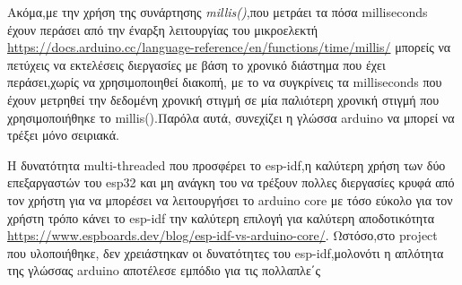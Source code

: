 Ακόμα,με την χρήση της συνάρτησης \textit{millis()},που μετράει τα πόσα milliseconds έχουν περάσει από την έναρξη λειτουργίας του μικροελεκτή \url{https://docs.arduino.cc/language-reference/en/functions/time/millis/} μπορείς να πετύχεις να εκτελέσεις διεργασίες με βάση το χρονικό διάστημα που έχει περάσει,χωρίς να χρησιμοποιηθεί διακοπή, με το να συγκρίνεις τα milliseconds που έχουν μετρηθεί την δεδομένη χρονική στιγμή σε μία παλιότερη χρονική στιγμή που χρησιμοποιήθηκε το millis().Παρόλα αυτά, συνεχίζει η γλώσσα arduino να μπορεί να τρέξει μόνο σειριακά.

Η δυνατότητα multi-threaded που προσφέρει το esp-idf,η καλύτερη χρήση των δύο επεξαργαστών του esp32 και μη ανάγκη του να τρέξουν πολλες διεργασίες κρυφά από τον χρήστη για να μπορέσει να λειτουργήσει το arduino core με τόσο εύκολο για τον χρήστη τρόπο κάνει το esp-idf την καλύτερη επιλογή για καλύτερη αποδοτικότητα \url{https://www.espboards.dev/blog/esp-idf-vs-arduino-core/}.
Ωστόσο,στο project που υλοποιήθηκε, δεν χρειάστηκαν οι δυνατότητες του esp-idf,μολονότι η απλότητα της γλώσσας arduino αποτέλεσε εμπόδιο για τις πολλαπλε΄ς





